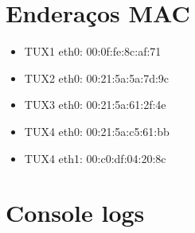 \documentclass[11pt,a4paper,reqno]{report}
\numberwithin{equation}{section}
\begin{document}
\begin{appendices}

\chapter{Enderaços MAC}

\begin{itemize} 
\item TUX1 eth0: 00:0f:fe:8c:af:71
\item TUX2 eth0: 00:21:5a:5a:7d:9c
\item TUX3 eth0: 00:21:5a:61:2f:4e
\item TUX4 eth0: 00:21:5a:c5:61:bb
\item TUX4 eth1: 00:c0:df:04:20:8c
\end{itemize}

\chapter{Console logs}


\end{appendices}
\end{document}
